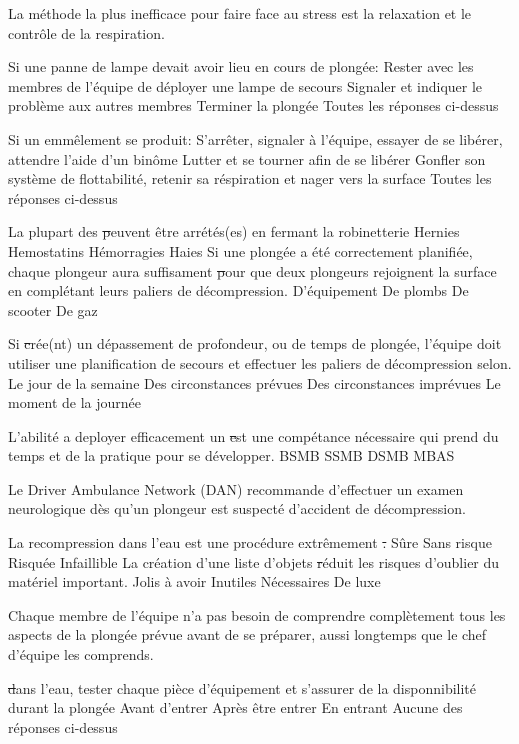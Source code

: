 \documentclass[english,10pt,twoside]{article}
\begin{document}
\begin{outline}
		\1 La méthode la plus inefficace pour faire face au stress est la relaxation et le contrôle de la respiration. \vf

		\1 Si une panne de lampe devait avoir lieu en cours de plongée:
			\2 Rester avec les membres de l'équipe de déployer une lampe de secours
			\2 Signaler et indiquer le problème aux autres membres
			\2 Terminer la plongée
			\2 Toutes les réponses ci-dessus

		\1 Si un emmêlement se produit:
			\2 S'arrêter, signaler à l'équipe, essayer de se libérer, attendre l'aide d'un binôme
			\2 Lutter et se tourner afin de se libérer
			\2 Gonfler son système de flottabilité, retenir sa réspiration et nager vers la surface
			\2 Toutes les réponses ci-dessus

		\1 La plupart des \st peuvent être arrétés(es) en fermant la robinetterie
			\2 Hernies
			\2 Hemostatins
			\2 Hémorragies
			\2 Haies
		\1 Si une plongée a été correctement planifiée, chaque plongeur aura suffisament \st pour que deux plongeurs rejoignent la surface en complétant leurs paliers de décompression.
			\2 D'équipement
			\2 De plombs
			\2 De scooter
			\2 De gaz

		\1 Si \st crée(nt) un dépassement de profondeur, ou de temps de plongée, l'équipe doit utiliser une planification de secours et effectuer les paliers de décompression selon.
			\2 Le jour de la semaine
			\2 Des circonstances prévues
			\2 Des circonstances imprévues
			\2 Le moment de la journée

		\1 L'abilité a deployer efficacement un \st est une compétance nécessaire qui prend du temps et de la pratique pour se développer.
			\2 BSMB
			\2 SSMB
			\2 DSMB
			\2 MBAS

		\1 Le Driver Ambulance Network (DAN) recommande d'effectuer un examen neurologique dès qu'un plongeur est suspecté d'accident de décompression. \vf

		\1 La recompression dans l'eau est une procédure extrêmement \st.
			\2 Sûre
			\2 Sans risque
			\2 Risquée
			\2 Infaillible
		\1 La création d'une liste d'objets \st réduit les risques d'oublier du matériel important.
			\2 Jolis à avoir
			\2 Inutiles
			\2 Nécessaires
			\2 De luxe

		\1 Chaque membre de l'équipe n'a pas besoin de comprendre complètement tous les aspects de la plongée prévue avant de se préparer, aussi longtemps que le chef d'équipe les comprends. \vf

		\1 \st dans l'eau, tester chaque pièce d'équipement et s'assurer de la disponnibilité durant la plongée
			\2 Avant d'entrer
			\2 Après être entrer
			\2 En entrant
			\2 Aucune des réponses ci-dessus


\end{outline}
\end{document}
